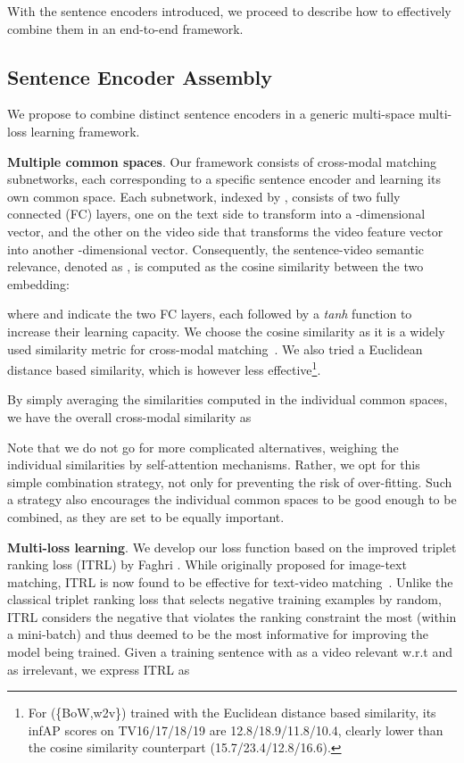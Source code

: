 With the sentence encoders introduced, we proceed to describe how to effectively combine them in an end-to-end framework.

\subsection{Sentence Encoder Assembly} \label{ssec:tea}

We propose to combine  distinct sentence encoders  in a generic multi-space multi-loss learning framework. 

\textbf{Multiple common spaces}. Our framework consists of  cross-modal matching subnetworks, each corresponding to a specific sentence encoder and learning its own common space. Each subnetwork, indexed by , consists of two fully connected (FC) layers, one on the text side to transform  into a -dimensional vector, and the other on the video side that transforms the video feature vector  into another -dimensional vector. Consequently, the sentence-video semantic relevance, denoted as , is computed as the cosine similarity between the two embedding:

where  and  indicate the two FC layers, each followed by a \textit{tanh} function to increase their learning capacity. We choose the cosine similarity as it is a widely used similarity metric for cross-modal matching~\cite{vsepp,liu-bmvc19,dong-cvpr19,miech-iccv19,sigir20-tce}. We also tried a Euclidean distance based similarity, which is however less effective\footnote{For \tea(\{BoW,w2v\}) trained with the Euclidean distance based similarity, its infAP scores on TV16/17/18/19 are 12.8/18.9/11.8/10.4, clearly lower than the cosine similarity counterpart (15.7/23.4/12.8/16.6).}. 

By simply averaging the similarities computed in the individual common spaces, we have the overall cross-modal similarity as 

Note that we do not go for more complicated alternatives, \eg weighing the individual similarities by self-attention mechanisms. 
Rather, we opt for this simple combination strategy, not only for preventing the risk of over-fitting. Such a strategy also encourages the individual common spaces to be good enough to be combined, as they are set to be equally important.

\textbf{Multi-loss learning}. We develop our loss function based on the improved triplet ranking loss (ITRL) by Faghri \etal \cite{vsepp}. While originally proposed for image-text matching, ITRL is now found to be effective for text-video matching~\cite{mithun-icmr18,w2vvpp,dong-cvpr19,liu-bmvc19,tv19-alibaba}. Unlike the classical triplet ranking loss that selects negative training examples by random, ITRL considers the negative that violates the ranking constraint the most (within a mini-batch) and thus deemed to be the most informative for improving the model being trained. Given a training sentence  with  as a video relevant w.r.t  and  as irrelevant, we express ITRL as 

